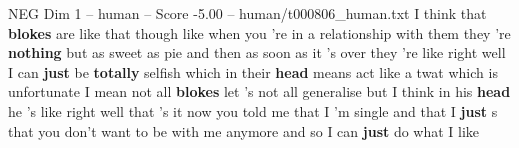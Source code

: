 \begin{textsample}{NEG Dim 1 – human – Score -5.00 – human/t000806\_human.txt}  \label{ex:f1_neg_040}
I think that \textbf{blokes} are like that though like when you 're in a relationship with them they 're \textbf{nothing} but as sweet as pie and then as soon as it 's over they 're like right well I can \textbf{just} be \textbf{totally} selfish which in their \textbf{head} means act like a twat which is unfortunate I mean not all \textbf{blokes} let 's not all generalise but I think in his \textbf{head} he 's like right well that 's it now you told me that I 'm single and that I \textbf{just} s that you don't want to be with me anymore and so I can \textbf{just} do what I like

\end{textsample}
